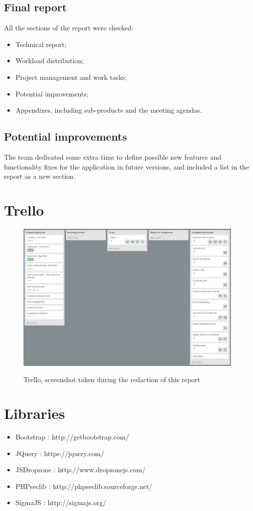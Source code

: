 \documentclass{cranfieldChart}
\begin{document}
\subsection*{Final report}
All the sections of the report were checked:
\begin{itemize}
	\item Technical report;
	\item Workload distribution;
	\item Project management and work tasks;
	\item Potential improvements;
	\item Appendixes, including sub-products and the meeting agendas.
\end{itemize} 
\subsection*{Potential improvements}
The team dedicated some extra time to define possible new features and functionality fixes for the application in future versions, and included a list in the report as a new section.
\newpage
\section{Trello}

\begin{figure}[h!]
\centering
\includegraphics[width=1\textwidth]{ressources/trello}
\label{trello}
\caption{Trello, screenshot taken during the redaction of this report}
\end{figure}

\newpage

\section{Libraries}
\begin{itemize}
\item Bootstrap : http://getbootstrap.com/
\item JQuery : https://jquery.com/
\item JSDropzone : http://www.dropzonejs.com/
\item PHPseclib : http://phpseclib.sourceforge.net/
\item SigmaJS : http://sigmajs.org/
\end{itemize}
\end{document}
